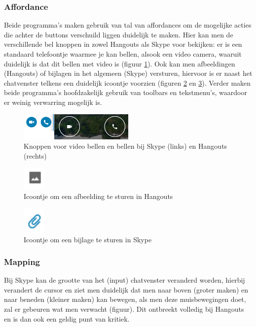 \documentclass[11pt]{article}
\begin{document}
\subsubsection{Affordance}
Beide programma's maken gebruik van tal van affordances om de mogelijke acties die achter de buttons verschuild liggen duidelijk te maken. Hier kan men de verschillende bel knoppen in zowel Hangouts als Skype voor bekijken: er is een standaard telefoontje waarmee je kan bellen, alsook een video camera, waaruit duidelijk is dat dit bellen met video is (figuur
 \ref{fig:callicons}). Ook kan men afbeeldingen (Hangouts) of bijlagen in het algemeen (Skype) versturen, hiervoor is er naast het chatvenster telkens een duidelijk icoontje voorzien (figuren \ref{fig:afbeelding} en \ref{fig:bijlage}). Verder maken beide programma's hoofdzakelijk gebruik van toolbars en tekstmenu's, waardoor er weinig verwarring mogelijk is.
\begin{figure}
	\centering
	\includegraphics[width=0.5\textwidth]{Niels_icoontjes.png}
	\caption{Knoppen voor video bellen en bellen bij Skype (links) en Hangouts (rechts)}
	\label{fig:callicons}
\end{figure}
\begin{figure}
	\centering
	\includegraphics[width=0.1\textwidth]{Niels_afbeelding.png}
	\caption{Icoontje om een afbeelding te sturen in Hangouts}
	\label{fig:afbeelding}
\end{figure}
\begin{figure}
	\centering
	\includegraphics[width=0.1\textwidth]{Niels_bijlage.png}
	\caption{Icoontje om een bijlage te sturen in Skype}
	\label{fig:bijlage}
\end{figure}
\newpage
\subsubsection{Mapping}
Bij Skype kan de grootte van het (input) chatvenster veranderd worden, hierbij verandert de cursor en ziet men duidelijk dat men naar boven (groter maken) en naar beneden (kleiner maken) kan bewegen, als men deze muisbewegingen doet, zal er gebeuren wat men verwacht (figuur). Dit ontbreekt volledig bij Hangouts en is dan ook een geldig punt van kritiek.
\end{document}
